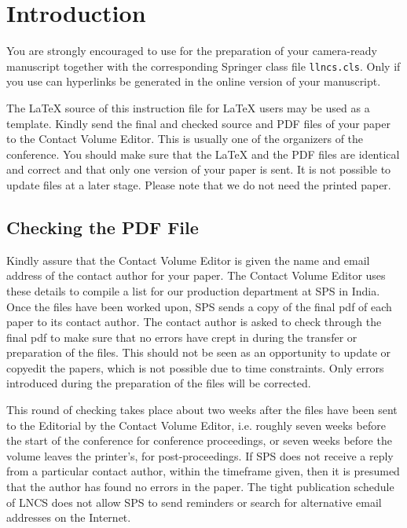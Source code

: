 \documentclass[runningheads]{llncs}
\begin{document}
\section{Introduction}

You are strongly encouraged to use \LaTeXe{} for the
preparation of your camera-ready manuscript together with the
corresponding Springer class file \verb+llncs.cls+. Only if you use
\LaTeXe{} can hyperlinks be generated in the online version
of your manuscript.

The \LaTeX{} source of this instruction file for \LaTeX{} users may be used as
a template. Kindly
send the final and checked source and PDF files of your paper to the
Contact Volume Editor. This is usually one of the organizers of the
conference. You should make sure that the \LaTeX{} and the PDF files are
identical and correct and that only one version of your paper is sent.
It is not possible to update files at a later stage. Please note that we
do not need the printed paper.

\subsection{Checking the PDF File}

Kindly assure that the Contact Volume Editor is given the name and email
address of the contact author for your paper. The Contact Volume Editor
uses these details to compile a list for our production department at
SPS in India. Once the files have been worked upon, SPS sends a copy of
the final pdf of each paper to its contact author. The contact author is
asked to check through the final pdf to make sure that no errors have
crept in during the transfer or preparation of the files. This should
not be seen as an opportunity to update or copyedit the papers, which is
not possible due to time constraints. Only errors introduced during the
preparation of the files will be corrected.

This round of checking takes place about two weeks after the files have
been sent to the Editorial by the Contact Volume Editor, i.e. roughly
seven weeks before the start of the conference for conference
proceedings, or seven weeks before the volume leaves the printer's, for
post-proceedings. If SPS does not receive a reply from a particular
contact author, within the timeframe given, then it is presumed that the
author has found no errors in the paper. The tight publication schedule
of LNCS does not allow SPS to send reminders or search for alternative
email addresses on the Internet.
\end{document}
